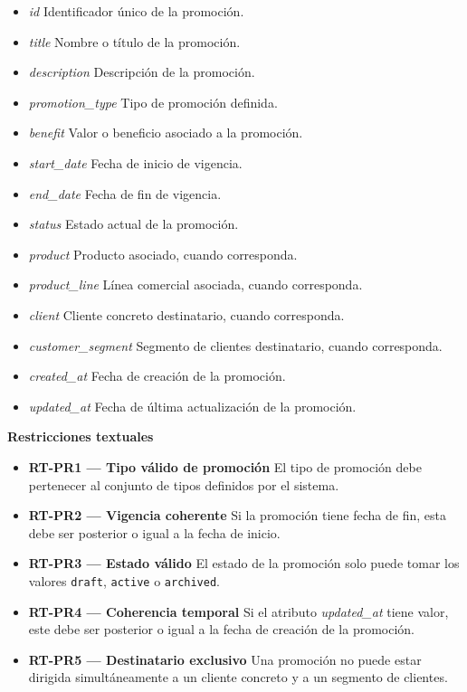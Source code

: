 \begin{itemize}

      \item \textit{id}
            Identificador único de la promoción.
      \item \textit{title}
            Nombre o título de la promoción.
      \item \textit{description}
            Descripción de la promoción.
      \item \textit{promotion\_type}
            Tipo de promoción definida.
      \item \textit{benefit}
            Valor o beneficio asociado a la promoción.
      \item \textit{start\_date}
            Fecha de inicio de vigencia.
      \item \textit{end\_date}
            Fecha de fin de vigencia.
      \item \textit{status}
            Estado actual de la promoción.
      \item \textit{product}
            Producto asociado, cuando corresponda.
      \item \textit{product\_line}
            Línea comercial asociada, cuando corresponda.
      \item \textit{client}
            Cliente concreto destinatario, cuando corresponda.
      \item \textit{customer\_segment}
            Segmento de clientes destinatario, cuando corresponda.
      \item \textit{created\_at}
            Fecha de creación de la promoción.
      \item \textit{updated\_at}
            Fecha de última actualización de la promoción.

\end{itemize}

\textbf{Restricciones textuales}

\begin{itemize}

      \item \textbf{RT-PR1 — Tipo válido de promoción}
            El tipo de promoción debe pertenecer al conjunto de tipos definidos por el sistema.
      \item \textbf{RT-PR2 — Vigencia coherente}
            Si la promoción tiene fecha de fin, esta debe ser posterior o igual a la fecha de inicio.
      \item \textbf{RT-PR3 — Estado válido}
            El estado de la promoción solo puede tomar los valores \texttt{draft}, \texttt{active} o \texttt{archived}.
      \item \textbf{RT-PR4 — Coherencia temporal}
            Si el atributo \textit{updated\_at} tiene valor, este debe ser posterior o igual a la fecha de creación de la promoción.
      \item \textbf{RT-PR5 — Destinatario exclusivo}
            Una promoción no puede estar dirigida simultáneamente a un cliente concreto y a un segmento de clientes.

\end{itemize}

